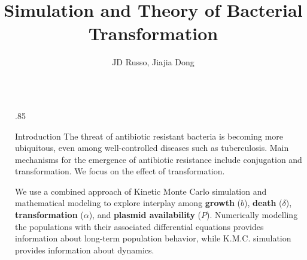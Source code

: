 \documentclass[final]{beamer}
\title{Simulation and Theory of Bacterial Transformation} %
\author{JD Russo, Jiajia Dong} %
\institute{Department of Physics and Astronomy, Bucknell University} %
\newlength{\onecolwid}
\begin{document}

\setlength{\belowcaptionskip}{2ex} %
\setlength\belowdisplayshortskip{2ex} %




\begin{frame}[t] %

\begin{block}

\begin{columns}[t] %
\begin{column}{4ex}\end{column} %

\begin{column}{.85\onecolwid}

  \begin{alertblock}{Introduction}
  The threat of antibiotic resistant bacteria is becoming more ubiquitous, even
  among well-controlled diseases such as tuberculosis. Main mechanisms
  for the emergence of antibiotic resistance include conjugation and transformation.
  We focus on the effect of transformation.

  \quad\quad We use a combined approach of Kinetic Monte Carlo simulation and
  mathematical
  modeling to explore interplay among \textbf{growth} ($b$), \textbf{death} ($\delta$), \textbf{transformation} ($\alpha$), and \textbf{plasmid availability} ($P$).
  Numerically modelling the populations with their
  associated differential equations provides information about long-term
  population behavior, while K.M.C. simulation provides information about dynamics.


\end{alertblock}
\end{column}
\end{columns}
\end{block}
\end{frame}
\end{document}
